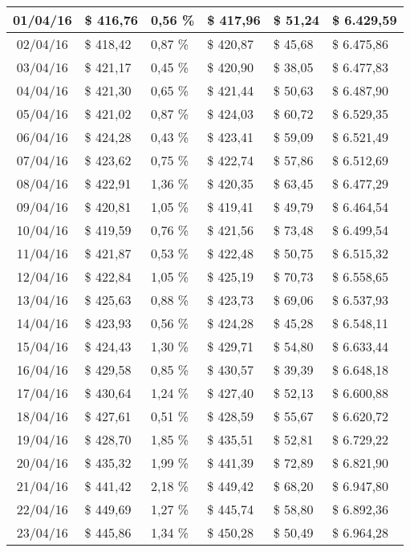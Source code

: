\begin{small}
\begin{longtable}{|c|l|l|l|l|l|}
01/04/16 & \$ 416,76 & 0,56 \% & \$ 417,96 & \$ 51,24 & \$ 6.429,59 \\ \hline
02/04/16 & \$ 418,42 & 0,87 \% & \$ 420,87 & \$ 45,68 & \$ 6.475,86 \\ \hline
03/04/16 & \$ 421,17 & 0,45 \% & \$ 420,90 & \$ 38,05 & \$ 6.477,83 \\ \hline
04/04/16 & \$ 421,30 & 0,65 \% & \$ 421,44 & \$ 50,63 & \$ 6.487,90 \\ \hline
05/04/16 & \$ 421,02 & 0,87 \% & \$ 424,03 & \$ 60,72 & \$ 6.529,35 \\ \hline
06/04/16 & \$ 424,28 & 0,43 \% & \$ 423,41 & \$ 59,09 & \$ 6.521,49 \\ \hline
07/04/16 & \$ 423,62 & 0,75 \% & \$ 422,74 & \$ 57,86 & \$ 6.512,69 \\ \hline
08/04/16 & \$ 422,91 & 1,36 \% & \$ 420,35 & \$ 63,45 & \$ 6.477,29 \\ \hline
09/04/16 & \$ 420,81 & 1,05 \% & \$ 419,41 & \$ 49,79 & \$ 6.464,54 \\ \hline
10/04/16 & \$ 419,59 & 0,76 \% & \$ 421,56 & \$ 73,48 & \$ 6.499,54 \\ \hline
11/04/16 & \$ 421,87 & 0,53 \% & \$ 422,48 & \$ 50,75 & \$ 6.515,32 \\ \hline
12/04/16 & \$ 422,84 & 1,05 \% & \$ 425,19 & \$ 70,73 & \$ 6.558,65 \\ \hline
13/04/16 & \$ 425,63 & 0,88 \% & \$ 423,73 & \$ 69,06 & \$ 6.537,93 \\ \hline
14/04/16 & \$ 423,93 & 0,56 \% & \$ 424,28 & \$ 45,28 & \$ 6.548,11 \\ \hline
15/04/16 & \$ 424,43 & 1,30 \% & \$ 429,71 & \$ 54,80 & \$ 6.633,44 \\ \hline
16/04/16 & \$ 429,58 & 0,85 \% & \$ 430,57 & \$ 39,39 & \$ 6.648,18 \\ \hline
17/04/16 & \$ 430,64 & 1,24 \% & \$ 427,40 & \$ 52,13 & \$ 6.600,88 \\ \hline
18/04/16 & \$ 427,61 & 0,51 \% & \$ 428,59 & \$ 55,67 & \$ 6.620,72 \\ \hline
19/04/16 & \$ 428,70 & 1,85 \% & \$ 435,51 & \$ 52,81 & \$ 6.729,22 \\ \hline
20/04/16 & \$ 435,32 & 1,99 \% & \$ 441,39 & \$ 72,89 & \$ 6.821,90 \\ \hline
21/04/16 & \$ 441,42 & 2,18 \% & \$ 449,42 & \$ 68,20 & \$ 6.947,80 \\ \hline
22/04/16 & \$ 449,69 & 1,27 \% & \$ 445,74 & \$ 58,80 & \$ 6.892,36 \\ \hline
23/04/16 & \$ 445,86 & 1,34 \% & \$ 450,28 & \$ 50,49 & \$ 6.964,28 \\ \hline

\end{longtable}
\end{small}
